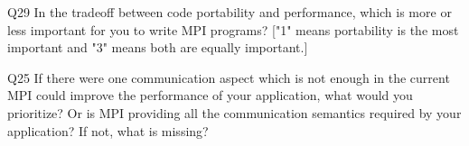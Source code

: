 \begin{description}%
\item{Q29} In the tradeoff between code portability and performance, which is more or less important for you to write MPI programs? ["1" means portability is the most important and "3" means both are equally important.]%
\item{Q25} If there were one communication aspect which is not enough in the current MPI could improve the performance of your application, what would you prioritize? Or is MPI providing all the communication semantics required by your application? If not, what is missing?%
\end{description}%
